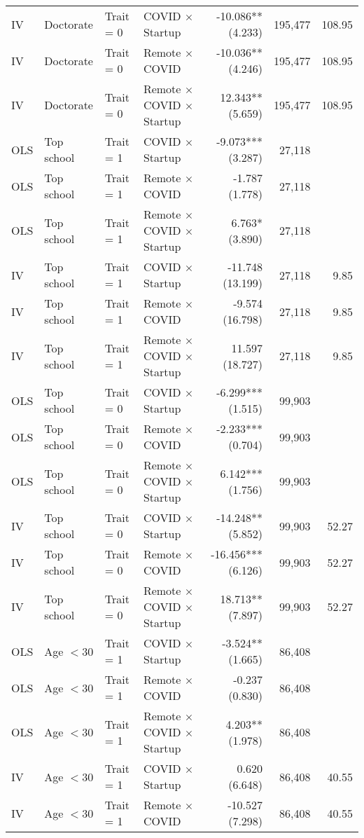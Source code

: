 \documentclass[11pt]{article}
\begin{document}
{\begin{longtable}{llllrrr}
IV & Doctorate & Trait = 0 & COVID $\times$ Startup & -10.086** (4.233) & 195,477 & 108.95 \\
IV & Doctorate & Trait = 0 & Remote $\times$ COVID & -10.036** (4.246) & 195,477 & 108.95 \\
IV & Doctorate & Trait = 0 & Remote $\times$ COVID $\times$ Startup &  12.343** (5.659) & 195,477 & 108.95 \\
OLS & Top school & Trait = 1 & COVID $\times$ Startup & -9.073*** (3.287) & 27,118 &  \\
OLS & Top school & Trait = 1 & Remote $\times$ COVID & -1.787 (1.778) & 27,118 &  \\
OLS & Top school & Trait = 1 & Remote $\times$ COVID $\times$ Startup &  6.763* (3.890) & 27,118 &  \\
IV & Top school & Trait = 1 & COVID $\times$ Startup & -11.748 (13.199) & 27,118 & 9.85 \\
IV & Top school & Trait = 1 & Remote $\times$ COVID & -9.574 (16.798) & 27,118 & 9.85 \\
IV & Top school & Trait = 1 & Remote $\times$ COVID $\times$ Startup &  11.597 (18.727) & 27,118 & 9.85 \\
OLS & Top school & Trait = 0 & COVID $\times$ Startup & -6.299*** (1.515) & 99,903 &  \\
OLS & Top school & Trait = 0 & Remote $\times$ COVID & -2.233*** (0.704) & 99,903 &  \\
OLS & Top school & Trait = 0 & Remote $\times$ COVID $\times$ Startup &  6.142*** (1.756) & 99,903 &  \\
IV & Top school & Trait = 0 & COVID $\times$ Startup & -14.248** (5.852) & 99,903 & 52.27 \\
IV & Top school & Trait = 0 & Remote $\times$ COVID & -16.456*** (6.126) & 99,903 & 52.27 \\
IV & Top school & Trait = 0 & Remote $\times$ COVID $\times$ Startup &  18.713** (7.897) & 99,903 & 52.27 \\
OLS & Age $< 30$ & Trait = 1 & COVID $\times$ Startup & -3.524** (1.665) & 86,408 &  \\
OLS & Age $< 30$ & Trait = 1 & Remote $\times$ COVID & -0.237 (0.830) & 86,408 &  \\
OLS & Age $< 30$ & Trait = 1 & Remote $\times$ COVID $\times$ Startup &  4.203** (1.978) & 86,408 &  \\
IV & Age $< 30$ & Trait = 1 & COVID $\times$ Startup &  0.620 (6.648) & 86,408 & 40.55 \\
IV & Age $< 30$ & Trait = 1 & Remote $\times$ COVID & -10.527 (7.298) & 86,408 & 40.55 \\

\end{longtable}}
\end{document}
